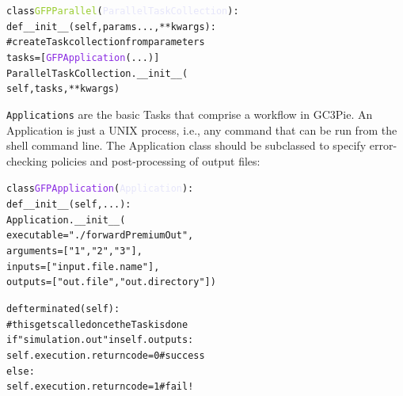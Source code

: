 \documentclass{PoS}
\begin{document}
\begin{center}
  \begin{minipage}{0.5\linewidth}
\begin{alltt}
class \textcolor{YellowGreen}{GFPParallel}(\textcolor{Lavender}{ParallelTaskCollection}):
  def __init__(self, params..., **kwargs):
    # create Task collection from parameters
    tasks = [ \textcolor{BlueViolet}{GFPApplication}(...) ]
    ParallelTaskCollection.__init__(
      self, tasks, **kwargs)
\end{alltt}
    \end{minipage}
  \end{center}


\texttt{Applications} are the basic Tasks that comprise a workflow in
GC3Pie. An Application is just a UNIX process, i.e., any command that
can be run from the shell command line.  The Application class should
be subclassed to specify error-checking policies and post-processing
of output files:

\begin{center}
  \begin{minipage}{0.5\linewidth}
\begin{alltt}
class \textcolor{BlueViolet}{GFPApplication}(\textcolor{Lavender}{Application}):
def __init__(self, ...):
  Application.__init__(
      executable="./forwardPremiumOut",
      arguments=[ "1", "2", "3" ],
      inputs=[ "input.file.name" ],
      outputs=[ "out.file", "out.directory" ])

  def terminated(self):
    # this gets called once the Task is done
    if "simulation.out" in self.outputs:
      self.execution.returncode = 0 # success
    else:
      self.execution.returncode = 1 # fail!
\end{alltt}
  \end{minipage}
\end{center}
\end{document}
